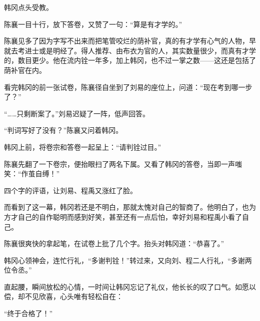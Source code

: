 韩冈点头受教。

陈襄一目十行，放下答卷，又赞了一句：“算是有才学的。”

陈襄见多了因为字写不出来而把笔管咬烂的荫补官，真的有才学有心气的人物，早就去考进士或是明经了。得人推荐、由布衣为官的人，其实数量很少，而真有才学的，数目更少。他在流内铨一年多，加上韩冈，也不过一掌之数——这还是包括了荫补官在内。

看完韩冈的前一张试卷，陈襄径自坐到了刘易的座位上，问道：“现在考到哪一步了？”

“……只剩断案了。”刘易迟疑了一阵，低声回答。

“判词写好了没有？”陈襄又问着韩冈。

韩冈上前，将卷宗和答卷一起呈上：“请判铨过目。”

陈襄先翻了一下卷宗，便抬眼扫了两名下属。又看了韩冈的答卷，当即一声嗤笑：“作茧自缚！”

四个字的评语，让刘易、程禹又涨红了脸。

而看到了这一幕，韩冈若还是不明白，那就太愧对自己的智商了。他明白了，也为方才自己的自作聪明而感到好笑，甚至还有一点后怕，幸好刘易和程禹小看了自己。

陈襄很爽快的拿起笔，在试卷上批了几个字。抬头对韩冈道：“恭喜了。”

韩冈心领神会，连忙行礼，“多谢判铨！”转过来，又向刘、程二人行礼，“多谢两位令丞。”

直起腰，瞬间放松的心情，一时间让韩冈忘记了礼仪，他长长的叹了口气。如愿以偿，却不见欣喜，心头唯有轻松自在：

“终于合格了！”

